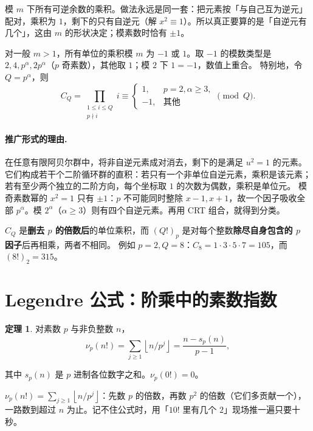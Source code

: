 \documentclass[UTF8,a4paper,11pt,oneside,openany,fontset=fandol]{ctexbook}
\theoremstyle{definition}
\newtheorem{theorem}[definition]{定理}
\newcommand{\floor}[1]{\left\lfloor #1\right\rfloor}
\begin{document}
\begin{tip}
模 $m$ 下所有可逆余数的乘积。做法永远是同一套：把元素按「与自己互为逆元」配对，乘积为 $1$，剩下的只有自逆元（解 $x^2\equiv1$）。所以真正要算的是「自逆元有几个」，这由 $m$ 的形状决定；模素数时恰有 $\pm1$。
\end{tip}

对一般 $m>1$，所有单位的乘积模 $m$ 为 $-1$ 或 $1$。取 $-1$ 的模数类型是 $2,4,p^\alpha,2p^\alpha$（$p$ 奇素数），其他取 $1$；模 $2$ 下 $1=-1$，数值上重合。
特别地，令 $Q=p^\alpha$，则
\[
 C_Q=\prod_{\substack{1\le i\le Q\\p\nmid i}}i\equiv
 \begin{cases}1,&p=2,\alpha\ge3,\\-1,&\text{其他}\end{cases}\pmod Q.
\]


\paragraph{推广形式的理由.}
在任意有限阿贝尔群中，将非自逆元素成对消去，剩下的是满足 $u^2=1$ 的元素。它们构成若干个二阶循环群的直积：若只有一个非单位自逆元素，乘积是该元素；若有至少两个独立的二阶方向，每个坐标取 $1$ 的次数为偶数，乘积是单位元。
模奇素数幂的 $x^2=1$ 只有 $\pm1$：$p$ 不可能同时整除 $x-1,x+1$，故一个因子吸收全部 $p^\alpha$。模 $2^\alpha$（$\alpha\ge3$）则有四个自逆元素。再用 CRT 组合，就得到分类。
\begin{pitfall}
$C_Q$ 是\textbf{删去 $p$ 的倍数后}的单位乘积，而 $(Q!)_p$ 是对每个整数\textbf{除尽自身包含的 $p$ 因子}后再相乘，两者不相同。
例如 $p=2,Q=8$：$C_8=1\cdot3\cdot5\cdot7=105$，而 $(8!)_2=315$。
\end{pitfall}


\section{Legendre 公式：阶乘中的素数指数}
\begin{theorem}
对素数 $p$ 与非负整数 $n$，
\[
 \nu_p(n!)=\sum_{j\ge1}\floor{n/p^j}
 =\frac{n-s_p(n)}{p-1},
\]


其中 $s_p(n)$ 是 $p$ 进制各位数字之和。$\nu_p(0!)=0$。
\end{theorem}

\begin{tip}[一句话版]
$\nu_p(n!)=\sum_{j\ge1}\floor{n/p^j}$：先数 $p$ 的倍数，再数 $p^2$ 的倍数（它们多贡献一个），一路数到超过 $n$ 为止。记不住公式时，用「$10!$ 里有几个 $2$」现场推一遍只要十秒。
\end{tip}
\end{document}
